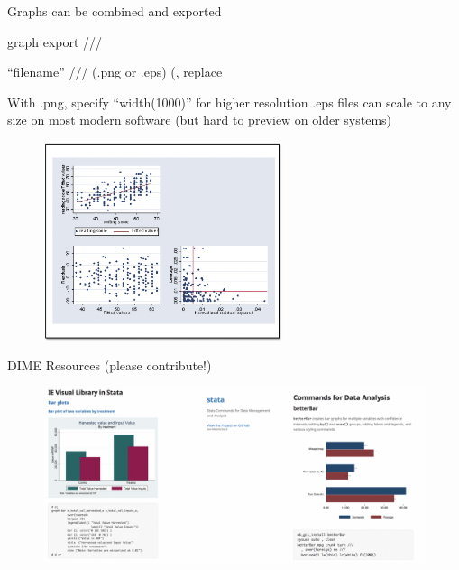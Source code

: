 \documentclass[aspectratio=169]{beamer}
\begin{document}
\begin{frame}{Graphs can be combined and exported}
	\begin{multicols}{2}	
		
		\leavevmode 	\newline  graph export ///

		\leavevmode 	\newline    “filename” /// (.png or .eps)
		\leavevmode		\newline  (, replace
 
		\leavevmode		\newline  With .png, specify “width(1000)” for higher resolution
		\newline  .eps files can scale to any size on most modern software (but hard to preview on older systems)
		
		\begin{figure}
			\centering
			\includegraphics[width=70mm]{img/Styling2}
		\end{figure}
		
	\end{multicols}
\end{frame}


\begin{frame}{DIME Resources (please contribute!)}
	
	\begin{figure}
		\centering
		\includegraphics[width=\linewidth]{img/Resources}
	\end{figure}
	
\end{frame}
\end{document}
